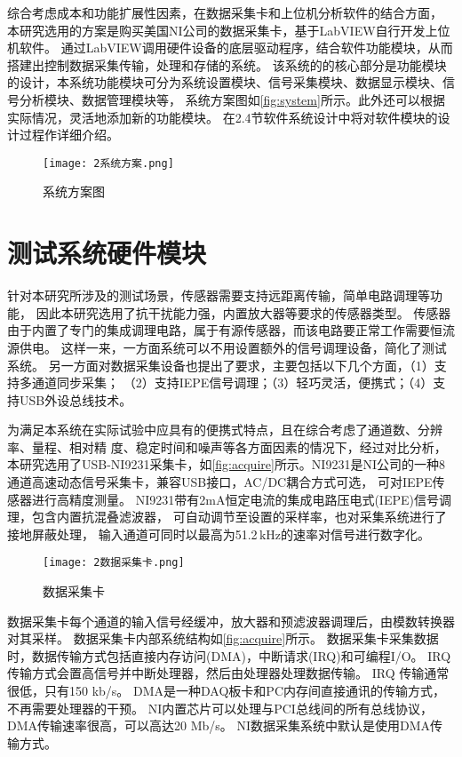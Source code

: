 综合考虑成本和功能扩展性因素，在数据采集卡和上位机分析软件的结合方面，
本研究选用的方案是购买美国NI公司的数据采集卡，基于LabVIEW自行开发上位机软件。
通过LabVIEW调用硬件设备的底层驱动程序，结合软件功能模块，从而搭建出控制数据采集传输，处理和存储的系统。
该系统的的核心部分是功能模块的设计，本系统功能模块可分为系统设置模块、信号采集模块、数据显示模块、信号分析模块、数据管理模块等，
系统方案图如\autoref{fig:system}所示。此外还可以根据实际情况，灵活地添加新的功能模块。
在2.4节软件系统设计中将对软件模块的设计过程作详细介绍。
\begin{figure}[htbp]
    \centering
    \texttt{[image: 2系统方案.png]}
    \caption{\label{fig:system}系统方案图}
\end{figure}

\section{测试系统硬件模块}
针对本研究所涉及的测试场景，传感器需要支持远距离传输，简单电路调理等功能，
因此本研究选用了抗干扰能力强，内置放大器等要求的传感器类型。
传感器由于内置了专门的集成调理电路，属于有源传感器，而该电路要正常工作需要恒流源供电。
这样一来，一方面系统可以不用设置额外的信号调理设备，简化了测试系统。
另一方面对数据采集设备也提出了要求，主要包括以下几个方面，（1）支持多通道同步采集；
（2）支持IEPE信号调理；（3）轻巧灵活，便携式；（4）支持USB外设总线技术。

为满足本系统在实际试验中应具有的便携式特点，且在综合考虑了通道数、分辨率、量程、相对精
度、稳定时间和噪声等各方面因素的情况下，经过对比分析，
本研究选用了USB-​NI9231采集卡，如\autoref{fig:acquire}所示。
​NI9231是NI公司的一种8通道高速动态信号采集卡，兼容USB接口，AC/DC耦合方式可选，
可对IEPE传感器进行高精度测量。
NI9231带有2mA恒定电流的集成电路压电式(IEPE)信号调理，包含内置抗混叠滤波器，
可自动调节至设置的采样率，也对采集系统进行了接地屏蔽处理，
输入通道可同时以最高为51.2$\mathrm{\,kHz}$的速率对信号进行数字化。

\begin{figure}[htbp]
    \centering
    \texttt{[image: 2数据采集卡.png]}
    \caption{\label{fig:acquire}数据采集卡}
\end{figure}
​
数据采集卡每个通道的输入信号经缓冲，放大器和预滤波器调理后，由模数转换器对其采样。
数据采集卡内部系统结构如\autoref{fig:acquire}所示。
数据采集卡采集数据时，数据传输方式包括直接内存访问(DMA)，中断请求(IRQ)和可编程I/O。
IRQ传输方式会置高信号并中断处理器，然后由处理器处理数据传输。
IRQ 传输通常很低，只有150 kb/s。
DMA是一种DAQ板卡和PC内存间直接通讯的传输方式，不再需要处理器的干预。
NI内置芯片可以处理与PCI总线间的所有总线协议，DMA传输速率很高，可以高达20 Mb/s。
NI数据采集系统中默认是使用DMA传输方式。


